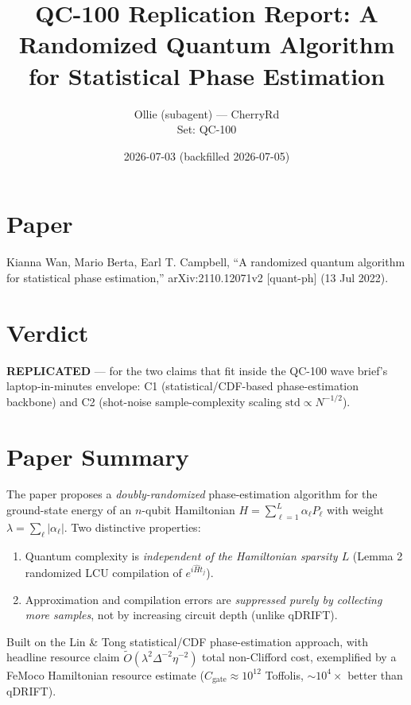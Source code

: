 \documentclass[11pt]{article}
\title{QC-100 Replication Report: A Randomized Quantum Algorithm for Statistical Phase Estimation}
\author{Ollie (subagent) --- CherryRd\\Set: QC-100}
\date{2026-07-03 (backfilled 2026-07-05)}
\begin{document}
\maketitle

\section*{Paper}
Kianna Wan, Mario Berta, Earl T. Campbell, ``A randomized quantum algorithm for statistical phase
estimation,'' arXiv:2110.12071v2 [quant-ph] (13 Jul 2022).

\section*{Verdict}
\textbf{REPLICATED} --- for the two claims that fit inside the QC-100 wave brief's laptop-in-minutes
envelope: C1 (statistical/CDF-based phase-estimation backbone) and C2 (shot-noise sample-complexity
scaling $\mathrm{std}\propto N^{-1/2}$).

\section{Paper Summary}
The paper proposes a \emph{doubly-randomized} phase-estimation algorithm for the ground-state energy
of an $n$-qubit Hamiltonian $H=\sum_{\ell=1}^L \alpha_\ell P_\ell$ with weight
$\lambda=\sum_\ell|\alpha_\ell|$. Two distinctive properties:
\begin{enumerate}
\item Quantum complexity is \emph{independent of the Hamiltonian sparsity $L$} (Lemma 2 randomized LCU
compilation of $e^{i\hat H t_j}$).
\item Approximation and compilation errors are \emph{suppressed purely by collecting more samples},
not by increasing circuit depth (unlike qDRIFT).
\end{enumerate}
Built on the Lin \& Tong statistical/CDF phase-estimation approach, with headline resource claim
$\tilde O(\lambda^2 \Delta^{-2}\eta^{-2})$ total non-Clifford cost, exemplified by a FeMoco
Hamiltonian resource estimate ($C_\text{gate}\approx 10^{12}$ Toffolis, $\sim 10^4\times$ better than qDRIFT).
\end{document}
